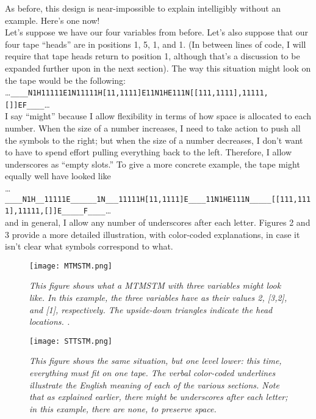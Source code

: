 \documentclass{article}
\begin{document}
As before, this design is near-impossible to explain intelligibly without an example. Here's one now! \\

Let's suppose we have our four variables from before. Let's also suppose that our four tape ``heads'' are in positions 1, 5, 1, and 1. (In between lines of code, I will require that tape heads return to position 1, although that's a discussion to be expanded further upon in the next section). The way this situation might look on the tape would be the following: \\

\dots\texttt{\_\_\_\_N1H11111E1N11111H[11,1111]E11N1HE111N[[111,1111],11111,[]]EF\_\_\_\_}\dots \\

I say ``might'' because I allow flexibility in terms of how space is allocated to each number. When the size of a number increases, I need to take action to push all the symbols to the right; but when the size of a number decreases, I don't want to have to spend effort pulling everything back to the left. Therefore, I allow underscores as ``empty slots.'' To give a more concrete example, the tape might equally well have looked like \\

\dots\texttt{\_\_\_\_N1H\_\_11111E\_\_\_\_\_\_1N\_\_\_11111H[11,1111]E\_\_\_\_11N1HE111N\_\_\_\_\_[[111,1111],11111,[]]E\_\_\_\_\_F\_\_\_\_}\dots \\

and in general, I allow any number of underscores after each letter. Figures 2 and 3 provide a more detailed illustration, with color-coded explanations, in case it isn't clear what symbols correspond to what. \\

\begin{figure} 
\begin{center} 
\texttt{[image: MTMSTM.png]} 
\caption{\small \sl This figure shows what a MTMSTM with three variables might look like. In this example, the three variables have as their values 2, [3,2], and [1], respectively. The upside-down triangles indicate the head locations. .\label{fig:Stupendous}} 
\end{center} 
\end{figure}  

\begin{figure} 
\begin{center} 
\texttt{[image: STTSTM.png]} 
\caption{\small \sl This figure shows the same situation, but one level lower: this time, everything must fit on one tape. The verbal color-coded underlines illustrate the English meaning of each of the various sections. Note that as explained earlier, there might be underscores after each letter; in this example, there are none, to preserve space.} 
\end{center} 
\end{figure}  
\end{document}
